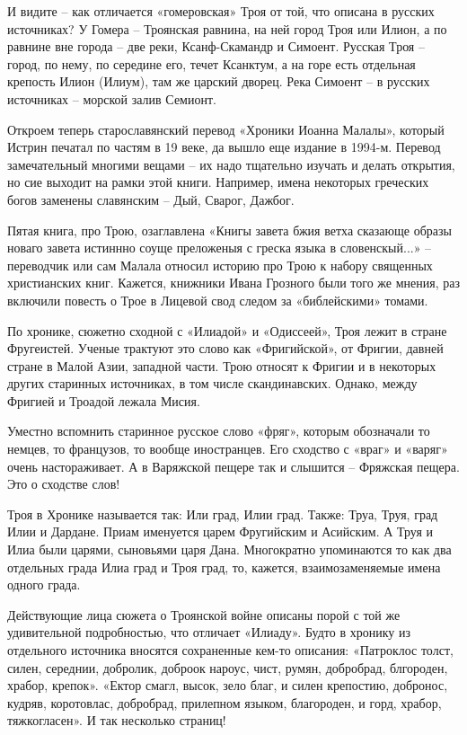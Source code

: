 И видите – как отличается «гомеровская» Троя от той, что описана в русских источниках? У Гомера – Троянская равнина, на ней город Троя или Илион, а по равнине вне города – две реки, Ксанф-Скамандр и Симоент. Русская Троя – город, по нему, по середине его, течет Ксанктум, а на горе есть отдельная крепость Илион (Илиум), там же царский дворец. Река Симоент – в русских источниках – морской залив Семионт.

Откроем теперь старославянский перевод «Хроники Иоанна Малалы», который Истрин печатал по частям в 19 веке, да вышло еще издание в 1994-м\cite{malala01}. Перевод замечательный многими вещами – их надо тщательно изучать и делать открытия, но сие выходит на рамки этой книги. Например, имена некоторых греческих богов заменены славянским – Дый, Сварог, Дажбог. 

Пятая книга, про Трою, озаглавлена «Книгы завета бжия ветха сказающе образы новаго завета истиннно соуще преложеныя с греска языка в словенскый...» – переводчик или сам Малала относил историю про Трою к набору священных христианских книг. Кажется, книжники Ивана Грозного были того же мнения, раз включили повесть о Трое в Лицевой свод следом за «библейскими» томами.

По хронике, сюжетно сходной с «Илиадой» и «Одиссеей», Троя лежит в стране Фругеистей. Ученые трактуют это слово как «Фригийской», от Фригии, давней стране в Малой Азии, западной части. Трою относят к Фригии и в некоторых других старинных источниках, в том числе скандинавских. Однако, между Фригией и Троадой лежала Мисия.

Уместно вспомнить старинное русское слово «фряг», которым обозначали то немцев, то французов, то вообще иностранцев. Его сходство с «враг» и «варяг» очень настораживает. А в Варяжской пещере так и слышится – Фряжская пещера. Это о сходстве слов!

Троя в Хронике называется так: Или град, Илии град. Также: Труа, Труя, град Илии и Дардане. Приам именуется царем Фругийским и Асийским. А Труя и Илиа были царями, сыновьями царя Дана. Многократно упоминаются то как два отдельных града Илиа град и Троя град, то, кажется, взаимозаменяемые имена одного града.

Действующие лица сюжета о Троянской войне описаны порой с той же удивительной подробностью, что отличает «Илиаду». Будто в хронику из отдельного источника вносятся сохраненные кем-то описания: «Патроклос толст, силен, середнии, добролик, доброок нароус, чист, румян, добробрад, блгороден, храбор, крепок». «Ектор смагл, высок, зело благ, и силен крепостию, добронос, кудряв, коротовлас, добробрад, прилепном языком, благороден, и горд, храбор, тяжкогласен». И так несколько страниц!

